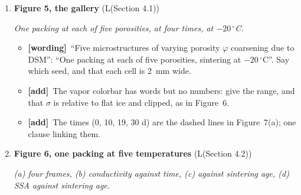 \documentclass[11pt]{article}
\newcommand{\Pg}[3]{\item \textbf{#1} {\small(#2)}\par\textit{#3}}
\newcommand{\tC}{\textcolor{miss}{\textbf{[correct]}}\ }
\newcommand{\tG}{\textcolor{stale}{\textbf{[wording]}}\ }
\newcommand{\tA}{\textcolor{have}{\textbf{[add]}}\ }
\begin{document}
\begin{enumerate}
\begin{itemize}
  \item \tA \textbf{Why the pore is red.} $\sigma$ is relative to flat ice,
    and Section~3.2 sets the far field to the Gibbs--Thomson value of the
    grains, $2d_0/R \approx 2.4\times10^{-5}$ for $R = 84~\mu$m, which is
    the top of the scale. Say this; a reader expects a saturated pore to be
    white.
  \item \tA \textbf{The starting neck.} The $t = 0$ frame shows overlapping
    grains with a neck of 28~$\mu$m. Say so; Section~3.2 and Appendix~B
    rest on it (provisional until the tangent-start run).
  \item \tC \textbf{The $t^{1/3}$ curve} is called ``the power law
    corresponding to the theorized sublimation/desublimation neck growth'':
    cite Demmenie et al.\ (2025), as Section~3.2 does (and a classical
    source, Introduction paragraph~4). Appendix~B finds 0.29 for
    the sharp-interface law at this grain size and $\alpha_c$; if the text
    compares with 0.29, the figure should show that curve, or both. Decide
    once the tangent-start run is in.
  \item \tA The legend writes $C(t+t_0)^{a}$; say what $t_0$ is (fitted)
    and the fit window (20~min to 100~h, as Section~3.2 says); temperature $-20\,^{\circ}$C, $R = 84~\mu$m,
    $\alpha_c = 10^{-3}$; the numbered circles mark the frames in (a).
  \item \tG ``An isolated ice grain pair shown undergoing sintering shown'':
    ``Two equal ice grains sintering in saturated air, at $t = 0$ (left)
    and 100~h (right)''. ``filed'', ``the the''.
  \end{itemize}
\Pg{Figure 5, the gallery}{L(Section 4.1)}{One packing at each of five porosities, at four times, at $-20\,^{\circ}$C.}
  \begin{itemize}
  \item \tG ``Five microstructures of varying porosity $\varphi$ coarsening
    due to DSM'': ``One packing at each of five porosities, sintering at
    $-20\,^{\circ}$C''. Say which seed, and that each cell is 2~mm wide.
  \item \tA The vapor colorbar has words but no numbers: give the range, and
    that $\sigma$ is relative to flat ice and clipped, as in Figure~6.
  \item \tA The times (0, 10, 19, 30 d) are the dashed lines in
    Figure~7(a); one clause linking them.
  \end{itemize}
\Pg{Figure 6, one packing at five temperatures}{L(Section 4.2)}{(a) four frames, (b) conductivity against time, (c) against sintering age, (d) SSA against sintering age.}

\end{enumerate}
\end{document}
